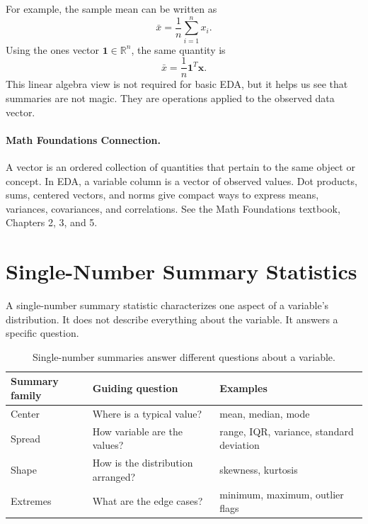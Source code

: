{For example, the sample mean can be written as
\begin{equation}
  \bar{x}=\frac{1}{n}\sum_{i=1}^n x_i.
  \label{eq:ch4-sample-mean}
\end{equation}
Using the ones vector $\mathbf{1}\in\mathbb{R}^n$, the same quantity is
\begin{equation}
  \bar{x}=\frac{1}{n}\mathbf{1}^T\mathbf{x}.
  \label{eq:ch4-sample-mean-vector}
\end{equation}
This linear algebra view is not required for basic EDA, but it helps us see that summaries are not magic.  They are operations applied to the observed data vector.

\paragraph{Math Foundations Connection.}
A vector is an ordered collection of quantities that pertain to the same object or concept.  In EDA, a variable column is a vector of observed values.  Dot products, sums, centered vectors, and norms give compact ways to express means, variances, covariances, and correlations.  See the Math Foundations textbook, Chapters 2, 3, and 5.

\section{Single-Number Summary Statistics}

A single-number summary statistic characterizes one aspect of a variable's distribution.  It does not describe everything about the variable.  It answers a specific question.

\begin{table}[h]
\centering
\begin{tabular}{@{}>{\raggedright\arraybackslash}p{}>{\raggedright\arraybackslash}p{}>{\raggedright\arraybackslash}p{}@{}}
\hline
Summary family & Guiding question & Examples \\
\hline
Center & Where is a typical value? & mean, median, mode \\
Spread & How variable are the values? & range, IQR, variance, standard deviation \\
Shape & How is the distribution arranged? & skewness, kurtosis \\
Extremes & What are the edge cases? & minimum, maximum, outlier flags \\
\hline
\end{tabular}
\caption{Single-number summaries answer different questions about a variable.}
\label{tab:ch4-summary-families}
\end{table}

}
